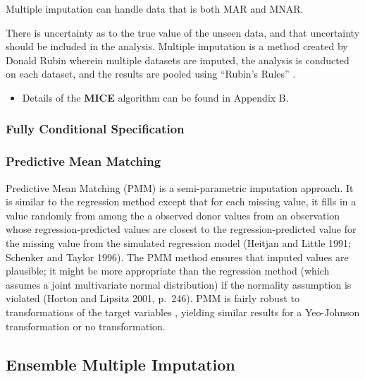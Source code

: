 \documentclass[12pt,]{article}
\providecommand{\tightlist}{%
  \setlength{\itemsep}{0pt}\setlength{\parskip}{0pt}}
\begin{document}
Multiple imputation can handle data that is both MAR and MNAR.

There is uncertainty as to the true value of the unseen data, and that
uncertainty should be included in the analysis. Multiple imputation is a
method created by Donald Rubin wherein multiple datasets are imputed,
the analysis is conducted on each dataset, and the results are pooled
using ``Rubin's Rules'' \citep{rubin_inference_1976}.

\begin{itemize}
\tightlist
\item
  Details of the \textbf{MICE} algorithm can be found in Appendix B.
\end{itemize}

\subsubsection{Fully Conditional
Specification}\label{fully-conditional-specification}

\subsubsection{Predictive Mean Matching}\label{predictive-mean-matching}

Predictive Mean Matching (PMM) is a semi-parametric imputation approach.
It is similar to the regression method except that for each missing
value, it fills in a value randomly from among the a observed donor
values from an observation whose regression-predicted values are closest
to the regression-predicted value for the missing value from the
simulated regression model (Heitjan and Little 1991; Schenker and Taylor
1996). The PMM method ensures that imputed values are plausible; it
might be more appropriate than the regression method (which assumes a
joint multivariate normal distribution) if the normality assumption is
violated (Horton and Lipsitz 2001, p.~246). PMM is fairly robust to
transformations of the target variables
\citep{van_buuren_flexible_2012}, yielding similar results for a
Yeo-Johnson transformation or no transformation.

\subsection{Ensemble Multiple
Imputation}\label{ensemble-multiple-imputation}
\end{document}
